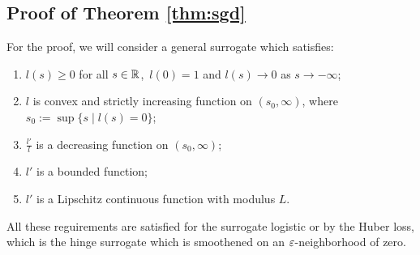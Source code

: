 \subsection{Proof of Theorem \ref{thm:sgd}}\label{app:sgd2}

For the proof, we will consider a general surrogate which satisfies:
\begin{enumerate}[label={(S\arabic*)}]
  \item \label{surr_basic1} $l(s)\ge 0$ for all $s\in\mathbb{R}$,\ $l(0)=1$ and $l(s)\to 0$ as $s\to-\infty$;
  \item \label{surr_basic2} $l$ is convex and strictly increasing function on $(s_0,\infty)$, where $s_0:=\sup\{s \mid l(s)=0\}$;
  \item \label{surr_ratio} $\frac{l'}{l}$ is a decreasing function on $(s_0,\infty)$;
  \item \label{surr_der1} $l'$ is a bounded function;
  \item \label{surr_der2} $l'$ is a Lipschitz continuous function with modulus $L$.
\end{enumerate}
All these reguirements are satisfied for the surrogate logistic or by the Huber loss, which is the hinge surrogate which is smoothened on an ${\varepsilon}$-neighborhood of zero.

